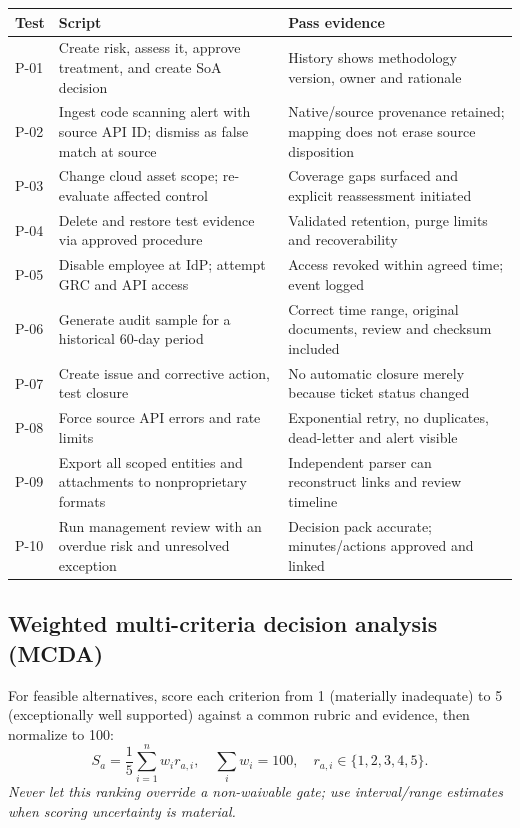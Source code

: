\documentclass[10pt,letterpaper]{article}
\begin{document}
\begin{longtable}{@{}L{0.50in}L{3.04in}L{2.80in}@{}}
\toprule
\textbf{Test} & \textbf{Script} & \textbf{Pass evidence}\\\midrule\endhead
P-01 & Create risk, assess it, approve treatment, and create SoA decision & History shows methodology version, owner and rationale\\
P-02 & Ingest code scanning alert with source API ID; dismiss as false match at source & Native/source provenance retained; mapping does not erase source disposition\\
P-03 & Change cloud asset scope; re-evaluate affected control & Coverage gaps surfaced and explicit reassessment initiated\\
P-04 & Delete and restore test evidence via approved procedure & Validated retention, purge limits and recoverability\\
P-05 & Disable employee at IdP; attempt GRC and API access & Access revoked within agreed time; event logged\\
P-06 & Generate audit sample for a historical 60-day period & Correct time range, original documents, review and checksum included\\
P-07 & Create issue and corrective action, test closure & No automatic closure merely because ticket status changed\\
P-08 & Force source API errors and rate limits & Exponential retry, no duplicates, dead-letter and alert visible\\
P-09 & Export all scoped entities and attachments to nonproprietary formats & Independent parser can reconstruct links and review timeline\\
P-10 & Run management review with an overdue risk and unresolved exception & Decision pack accurate; minutes/actions approved and linked\\
\bottomrule
\end{longtable}
\normalsize

\subsection{Weighted multi-criteria decision analysis (MCDA)}
For feasible alternatives, score each criterion from 1 (materially inadequate) to 5 (exceptionally well supported) against a common rubric and evidence, then normalize to 100:
\begin{equation}\label{eq:score}
S_a = \frac{1}{5}\sum_{i=1}^{n} w_i r_{a,i},\quad \sum_i w_i=100,\quad r_{a,i}\in\{1,2,3,4,5\}.
\end{equation}
\textit{Never let this ranking override a non-waivable gate; use interval/range estimates when scoring uncertainty is material.}
\end{document}
